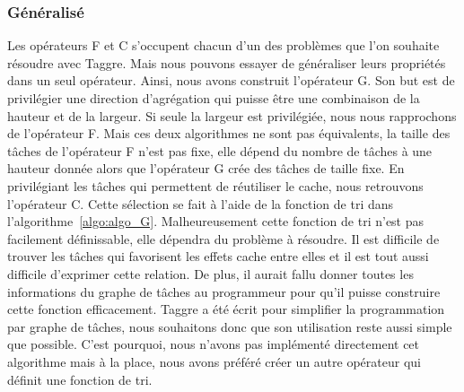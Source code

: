 \subsubsection{Généralisé}
Les opérateurs F et C s'occupent chacun d'un des problèmes que l'on souhaite résoudre avec Taggre.
%
Mais nous pouvons essayer de généraliser leurs propriétés dans un seul opérateur.
%
Ainsi, nous avons construit l'opérateur G.
%
Son but est de privilégier une direction d'agrégation qui puisse être une combinaison de la hauteur et de la largeur.
%
Si seule la largeur est privilégiée, nous nous rapprochons de l'opérateur F.
%
Mais ces deux algorithmes ne sont pas équivalents, la taille des tâches de l'opérateur F n'est pas fixe, elle dépend du nombre de tâches à une hauteur donnée alors que l'opérateur G crée des tâches de taille fixe.
%
En privilégiant les tâches qui permettent de réutiliser le cache, nous retrouvons l'opérateur C.
%
Cette sélection se fait à l'aide de la fonction de tri dans l'algorithme~\ref{algo:algo_G}.
%
Malheureusement cette fonction de tri n'est pas facilement définissable, elle dépendra du problème à résoudre.
%
Il est difficile de trouver les tâches qui favorisent les effets cache entre elles et il est tout aussi difficile d'exprimer cette relation.
%
De plus, il aurait fallu donner toutes les informations du graphe de tâches au programmeur pour qu'il puisse construire cette fonction efficacement.
%
Taggre a été écrit pour simplifier la programmation par graphe de tâches, nous souhaitons donc que son utilisation reste aussi simple que possible.
%
C'est pourquoi, nous n'avons pas implémenté directement cet algorithme mais à la place, nous avons préféré créer un autre opérateur qui définit une fonction de tri.


